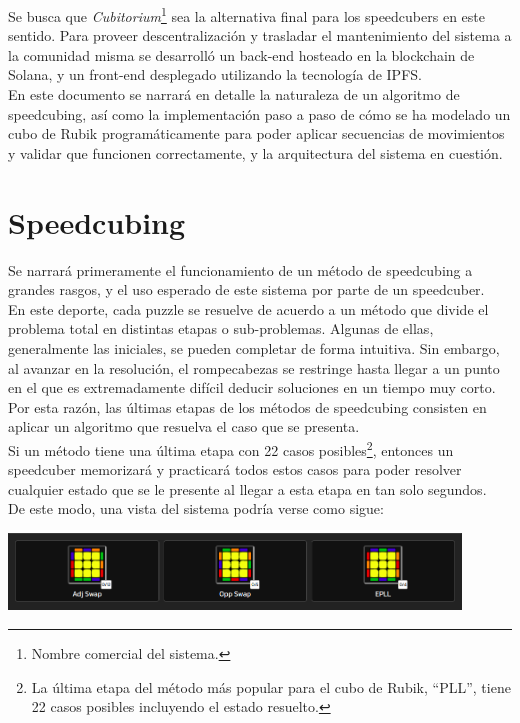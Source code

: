 \begin{multicols}{2}
Se busca que \textit{Cubitorium}\footnote{Nombre comercial del sistema.} sea la alternativa final para los speedcubers en este sentido. Para proveer descentralización y trasladar el mantenimiento del sistema a la comunidad misma se desarrolló un back-end hosteado en la blockchain de Solana\cite{solana}, y un front-end desplegado utilizando la tecnología de IPFS\cite{ipfs}.\\

En este documento se narrará en detalle la naturaleza de un algoritmo de speedcubing, así como la implementación paso a paso de cómo se ha modelado un cubo de Rubik programáticamente para poder aplicar secuencias de movimientos y validar que funcionen correctamente, y la arquitectura del sistema en cuestión.

\section{Speedcubing}

Se narrará primeramente el funcionamiento de un método de speedcubing a grandes rasgos, y el uso esperado de este sistema por parte de un speedcuber.\\

En este deporte, cada puzzle se resuelve de acuerdo a un método que divide el problema total en distintas etapas o sub-problemas. Algunas de ellas, generalmente las iniciales, se pueden completar de forma intuitiva. Sin embargo, al avanzar en la resolución, el rompecabezas se restringe hasta llegar a un punto en el que es extremadamente difícil deducir soluciones en un tiempo muy corto. Por esta razón, las últimas etapas de los métodos de speedcubing consisten en aplicar un algoritmo que resuelva el caso que se presenta.\\

Si un método tiene una última etapa con 22 casos posibles\footnote{La última etapa del método más popular para el cubo de Rubik, ``PLL'', tiene 22 casos posibles incluyendo el estado resuelto.}, entonces un speedcuber memorizará y practicará todos estos casos para poder resolver cualquier estado que se le presente al llegar a esta etapa en tan solo segundos.\\

De este modo, una vista del sistema podría verse como sigue:\\

\begin{Figure}
\centering
    \includegraphics[width=0.9\textwidth]{img/plls_speedcubedb.png}
 \label{fig:pll-speedcubedb}
\end{Figure}


\end{multicols}
